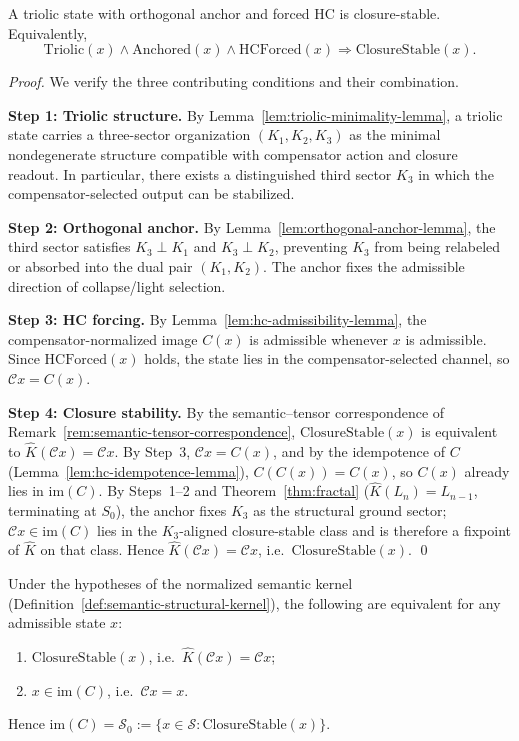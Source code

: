\begin{lemma}
\label{lem:closure-forcing-lemma}
A triolic state with orthogonal anchor and forced HC is closure-stable.
Equivalently,
\[
\mathrm{Triolic}(x)\wedge \mathrm{Anchored}(x)\wedge \mathrm{HCForced}(x)
\Longrightarrow \mathrm{ClosureStable}(x).
\]
\end{lemma}

\begin{proof}
We verify the three contributing conditions and their combination.

\smallskip
\noindent\textbf{Step 1: Triolic structure.}
By Lemma~\ref{lem:triolic-minimality-lemma}, a triolic state carries a
three-sector organization $(K_1,K_2,K_3)$ as the minimal nondegenerate
structure compatible with compensator action and closure readout.
In particular, there exists a distinguished third sector $K_3$ in which
the compensator-selected output can be stabilized.

\smallskip
\noindent\textbf{Step 2: Orthogonal anchor.}
By Lemma~\ref{lem:orthogonal-anchor-lemma}, the third sector satisfies
$K_3\perp K_1$ and $K_3\perp K_2$, preventing $K_3$ from being
relabeled or absorbed into the dual pair $(K_1,K_2)$.
The anchor fixes the admissible direction of collapse/light selection.

\smallskip
\noindent\textbf{Step 3: HC forcing.}
By Lemma~\ref{lem:hc-admissibility-lemma}, the compensator-normalized
image $C(x)$ is admissible whenever $x$ is admissible. Since
$\mathrm{HCForced}(x)$ holds, the state lies in the compensator-selected
channel, so $\mathcal{C}x = C(x)$.

\smallskip
\noindent\textbf{Step 4: Closure stability.}
By the semantic--tensor correspondence of
Remark~\ref{rem:semantic-tensor-correspondence},
$\mathrm{ClosureStable}(x)$ is equivalent to
$\hat{K}(\mathcal{C}x) = \mathcal{C}x$.
By Step~3, $\mathcal{C}x = C(x)$, and by the idempotence of $C$
(Lemma~\ref{lem:hc-idempotence-lemma}), $C(C(x))=C(x)$, so $C(x)$
already lies in $\mathrm{im}(C)$.
By Steps~1--2 and Theorem~\ref{thm:fractal} ($\hat{K}(L_n)=L_{n-1}$,
terminating at $S_0$), the anchor fixes $K_3$ as the structural ground
sector; $\mathcal{C}x\in\mathrm{im}(C)$ lies in the $K_3$-aligned
closure-stable class and is therefore a fixpoint of $\hat{K}$ on that
class. Hence $\hat{K}(\mathcal{C}x)=\mathcal{C}x$, i.e.\ $\mathrm{ClosureStable}(x)$. \qed
\end{proof}

\begin{lemma}
\label{lem:closure-stable-iff-im-C}
Under the hypotheses of the normalized semantic kernel
(Definition~\ref{def:semantic-structural-kernel}), the following are equivalent
for any admissible state $x$:
\begin{enumerate}[label=(\roman*)]
 \item $\mathrm{ClosureStable}(x)$, i.e.\ $\hat{K}(\mathcal{C}x)=\mathcal{C}x$;
 \item $x \in \mathrm{im}(C)$, i.e.\ $\mathcal{C}x = x$.
\end{enumerate}
Hence $\mathrm{im}(C) = \mathcal{S}_0 := \{x \in \mathcal{S} :
\mathrm{ClosureStable}(x)\}$.
\end{lemma}

